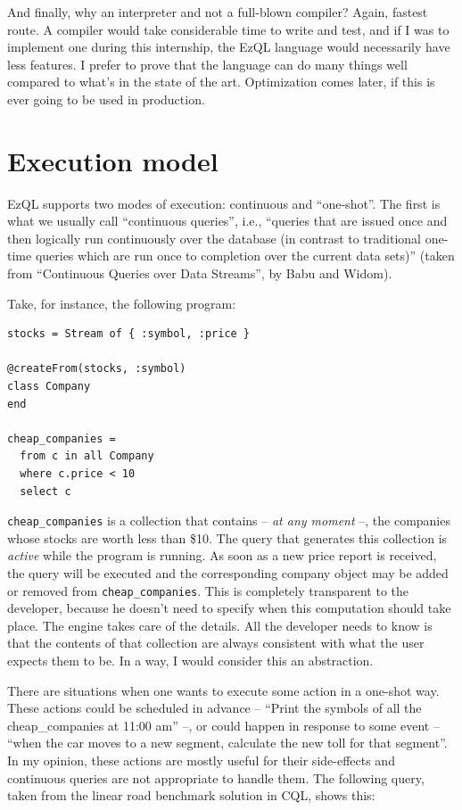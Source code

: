 \documentclass{report}
\begin{document}
And finally, why an interpreter and not a full-blown compiler? Again,
fastest route. A compiler would take considerable time to write and
test, and if I was to implement one during this internship, the EzQL
language would necessarily have less features. I prefer to prove that
the language can do many things well compared to what's in the state
of the art. Optimization comes later, if this is ever going to be used
in production.


\chapter{Execution model}

EzQL supports two modes of execution: continuous and ``one-shot''. The
first is what we usually call ``continuous queries'', i.e., ``queries
that are issued once and then logically run continuously over the
database (in contrast to traditional one-time queries which are run
once to completion over the current data sets)'' (taken from
``Continuous Queries over Data Streams'', by Babu and Widom).

Take, for instance, the following program:

\begin{verbatim}
stocks = Stream of { :symbol, :price }

@createFrom(stocks, :symbol)
class Company
end

cheap_companies =
  from c in all Company
  where c.price < 10
  select c
\end{verbatim}

\verb=cheap_companies= is a collection that contains -- \emph{at any
  moment} --, the companies whose stocks are worth less than \$10. The
query that generates this collection is \emph{active} while the
program is running. As soon as a new price report is received, the
query will be executed and the corresponding company object may be
added or removed from \verb=cheap_companies=. This is completely
transparent to the developer, because he doesn't need to specify when
this computation should take place. The engine takes care of the
details. All the developer needs to know is that the contents of that
collection are always consistent with what the user expects them to
be. In a way, I would consider this an abstraction.

There are situations when one wants to execute some action in a
one-shot way. These actions could be scheduled in advance -- ``Print
the symbols of all the cheap\_companies at 11:00 am'' --, or could
happen in response to some event -- ``when the car moves to a new
segment, calculate the new toll for that segment''. In my opinion,
these actions are mostly useful for their side-effects and continuous
queries are not appropriate to handle them. The following query, taken
from the linear road benchmark solution in CQL, shows this:
\end{document}
